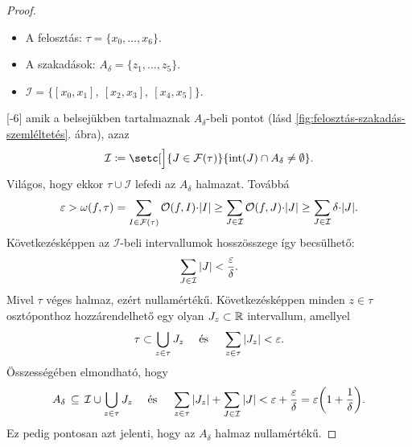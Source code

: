 \documentclass[
]{elteikthesis}[2024/04/26]
\begin{document}
\begin{proof}
{
			\label{fig:felosztás-szakadás-szemléltetés}
				
			\begin{itemize}
				\item A felosztás: \( \tau = \{ x_0, \dots, x_6 \} \).
				\item A szakadások: \( A_\delta = \{ z_1, \dots, z_5 \} \).
				\item \( \mathcal{I} = \bigl\{ [x_0, x_1], \ [x_2, x_3], \ [x_4, x_5] \bigr\} \).
			\end{itemize}
		}[-6\baselineskip]
		amik a belsejükben tartalmaznak \( A_\delta \)-beli pontot (lásd \ref{fig:felosztás-szakadás-szemléltetés}. ábra), azaz
		\[
			\mathcal{I} \coloneq
			\setc[\Big]{ J \in \mathcal{F}(\tau) }{ \inter(J) \cap A_\delta \neq \emptyset }.
		\]
		Világos, hogy ekkor \( \tau \cup \mathcal{I} \) lefedi az \( A_\delta \) halmazat.
		Továbbá%
		\[
			\varepsilon	>
			\omega(f, \tau) =
			\sum_{I \in \mathcal{F}(\tau)} \mathcal{O}(f, I) {\cdot} \abs{I} \geq
			\sum_{J \in \mathcal{I}} \mathcal{O}(f, J) {\cdot} \abs{J} \geq
			\sum_{J \in \mathcal{I}} \delta {\cdot} \abs{J}.
		\]
		Következésképpen az \( \mathcal{I} \)-beli intervallumok hosszösszege így becsülhető:
		\[
			\sum_{J \in \mathcal{I}} \abs{J} < \frac{\varepsilon}{\delta}.
		\]
		Mivel \( \tau \) véges halmaz, ezért nullamértékű. 
		Következésképpen minden \( z \in \tau \) osztóponthoz hozzárendelhető 
		egy olyan \( J_z \subset \mathbb{R} \) intervallum, amellyel
		\[
			\tau \subset \bigcup_{z \in \tau} J_z
			\quad \text{ és } \quad
			\sum_{z \in \tau} \abs{J_z} < \varepsilon.
		\]
		Összességében elmondható, hogy
		\[
			A_\delta \,\subseteq\,
			\mathcal{I} \cup
			\bigcup_{z \in \tau} J_z
			\quad \text{ és } \quad
			\sum_{z \in \tau} \abs{J_z} + \sum_{J \in \mathcal{I}} \abs{J} <
			\varepsilon + \frac{\varepsilon}{\delta} =
			\varepsilon \biggl( 1 + \frac{1}{\delta} \biggr).
		\]
		Ez pedig pontosan azt jelenti, hogy az \( A_\delta \) halmaz nullamértékű.
		

\end{proof}
\end{document}
